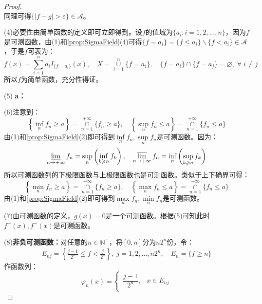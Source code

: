 \begin{proof}
\begin{equation*}
	\end{equation*}
	同理可得$\{|f-g|>\varepsilon\}\in\mathscr{A}$。\par
	(4)必要性由简单函数的定义即可立即得到。设$f$的值域为$\{a_i:i=1,2,\dots,n\}$，因为$f$是可测函数，由(1)和\cref{prop:SigmaField}(4)可得$\{f=a_i\}=\{f\leqslant a_i\}\backslash\{f<a_i\}\in\mathscr{A}$，于是$f$可表为：
	\begin{equation*}
		f(x)=\sum_{i=1}^{n}a_iI_{\{f=a_i\}}(x),\quad X=\underset{i=1}{\overset{n}{\cup}}\{f=a_i\},\quad\{f=a_i\}\cap\{f=a_j\}=\varnothing,\;\forall\;i\ne j
	\end{equation*}
	所以$f$为简单函数，充分性得证。\par
	(5)\textbf{ a：}\par
	(6)注意到：
	\begin{equation*}
		\left\{\inf_nf_n\geqslant a\right\}=\underset{n=1}{\overset{+\infty}{\cap}}\{f_n\geqslant a\},\quad\left\{\sup_nf_n\leqslant a\right\}=\underset{n=1}{\overset{+\infty}{\cap}}\{f_n\leqslant a\}
	\end{equation*}
	由(1)和\cref{prop:SigmaField}(2)即可得到$\inf\limits_nf_n,\sup\limits_nf_n$是可测函数。因为：
	\begin{equation*}
		\varliminf_{n\to+\infty}f_n=\sup_{n}\left(\inf_{k\geqslant n}f_k\right),\quad\varlimsup_{n\to+\infty}f_n=\inf_{n}\left(\sup_{k\geqslant n}f_k\right)
	\end{equation*}
	所以可测函数列的下极限函数与上极限函数也是可测函数。类似于上下确界可得：
	\begin{equation*}
		\left\{\min_nf_n\geqslant a\right\}=\underset{n=1}{\overset{+\infty}{\cap}}\{f_n\geqslant a\},\quad\left\{\max_nf_n\leqslant a\right\}=\underset{n=1}{\overset{+\infty}{\cap}}\{f_n\leqslant a\}
	\end{equation*}
	由(1)和\cref{prop:SigmaField}(2)即可得到$\max\limits_nf_n,\min\limits_nf_n$是可测函数。\par
	(7)由可测函数的定义，$g(x)=0$是一个可测函数。根据(5)可知此时$f^+(x),f^-(x)$是可测函数。\par
	(8)\textbf{非负可测函数：}对任意的$n\in\mathbb{N}^+$，将$[0,n]$分为$n2^n$份，令：
	\begin{gather*}
		E_{nj}=\left\{\frac{j-1}{2^n}\leqslant f<\frac{j}{2^n}\right\},\;j=1,2,\dots,n2^n ,\quad E_n=\{f\geqslant n\}
	\end{gather*}
	作函数列：
	\begin{equation*}
		\varphi_n(x)=
		\begin{cases}
			\dfrac{j-1}{2^n},&x\in E_{nj} \\

\end{cases}
\end{equation*}
\end{proof}
